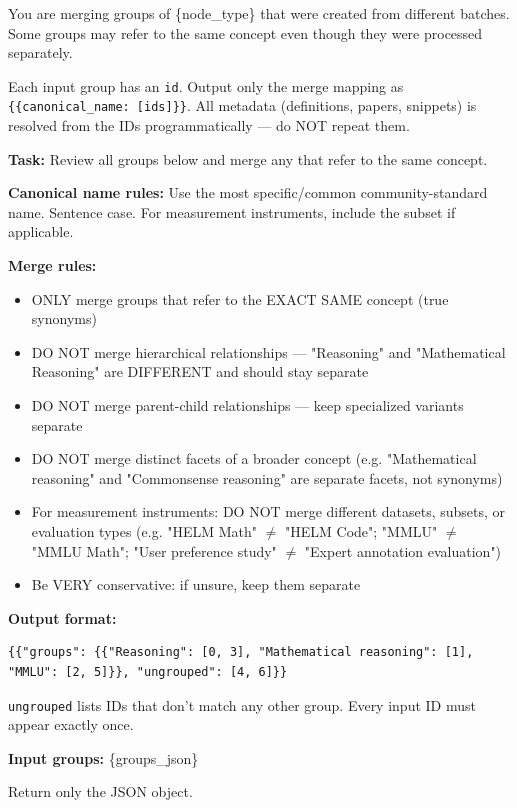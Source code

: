 \begin{tcolorbox}[breakable,enhanced,colback=blue!3,colframe=blue!40!black,title={Prompt},fonttitle=\bfseries,left=8pt,right=8pt,top=6pt,bottom=6pt]

You are merging groups of \{node\_type\} that were created from different batches. Some groups may refer to the same concept even though they were processed separately.

Each input group has an \texttt{id}. Output only the merge mapping as \texttt{\{\{canonical\_name: [ids]\}\}}. All metadata (definitions, papers, snippets) is resolved from the IDs programmatically --- do NOT repeat them.

\textbf{Task:}
Review all groups below and merge any that refer to the same concept.

\textbf{Canonical name rules:} Use the most specific/common community-standard name. Sentence case. For measurement instruments, include the subset if applicable.

\textbf{Merge rules:}
\begin{itemize}
\item ONLY merge groups that refer to the EXACT SAME concept (true synonyms)
\item DO NOT merge hierarchical relationships --- "Reasoning" and "Mathematical Reasoning" are DIFFERENT and should stay separate
\item DO NOT merge parent-child relationships --- keep specialized variants separate
\item DO NOT merge distinct facets of a broader concept (e.g. "Mathematical reasoning" and "Commonsense reasoning" are separate facets, not synonyms)
\item For measurement instruments: DO NOT merge different datasets, subsets, or evaluation types (e.g. "HELM Math" $\neq$ "HELM Code"; "MMLU" $\neq$ "MMLU Math"; "User preference study" $\neq$ "Expert annotation evaluation")
\item Be VERY conservative: if unsure, keep them separate
\end{itemize}

\textbf{Output format:}
\begin{verbatim}
{{"groups": {{"Reasoning": [0, 3], "Mathematical reasoning": [1], "MMLU": [2, 5]}}, "ungrouped": [4, 6]}}
\end{verbatim}
\texttt{ungrouped} lists IDs that don't match any other group. Every input ID must appear exactly once.

\textbf{Input groups:}
\{groups\_json\}

Return only the JSON object.
\end{tcolorbox}
